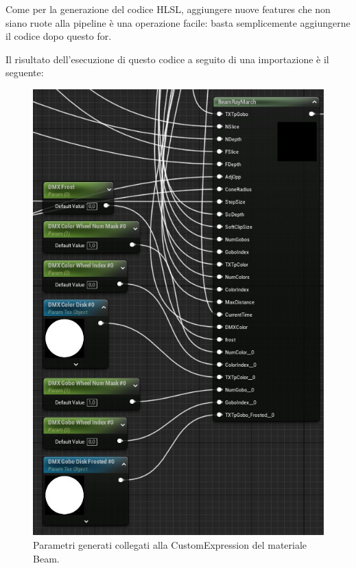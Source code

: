 \documentclass[main.tex]{subfiles}
\begin{document}
Come per la generazione del codice HLSL, aggiungere nuove features che non siano ruote alla pipeline è una operazione facile: basta semplicemente aggiungerne il codice dopo questo for.\newline
\clearpage %

Il risultato dell'esecuzione di questo codice a seguito di una importazione è il seguente: 
\begin{figure}
    \centering
    \captionsetup{justification=centering}
    \includegraphics[scale=0.516]{img/renderingPipeline/beamMaterialGenerated.jpg}
    \caption{Parametri generati collegati alla CustomExpression del materiale Beam.}
    \label{fig:2_beamGenerated}
\end{figure}
\end{document}
